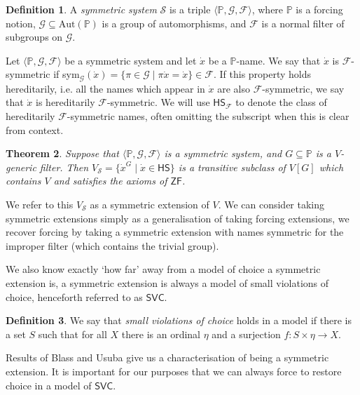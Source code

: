 \documentclass[a4paper,11pt]{amsart}
\newtheorem{theorem}{Theorem}[section]
\theoremstyle{definition}
\newtheorem{definition}[theorem]{Definition}
\newcommand{\p}{\mathbb{P}}
\newcommand{\ZF}{\mathsf{ZF}}
\newcommand{\HS}{\mathsf{HS}}
\newcommand{\SVC}{\mathsf{SVC}}
\begin{document}
\begin{definition}
    A \emph{symmetric system} $\mathscr{S}$ is a triple $\langle \p, \mathscr{G}, \mathscr{F} \rangle$, where $\p$ is a forcing notion, $\mathscr{G} \subseteq \text{Aut}(\p)$ is a group of automorphisms, and $\mathscr{F}$ is a normal filter of subgroups on $\mathscr{G}$.
\end{definition}

Let $\langle \p, \mathscr{G}, \mathscr{F} \rangle$ be a symmetric system and let $\dot{x}$ be a $\p$-name. We say that $\dot{x}$ is $\mathscr{F}$-symmetric if sym$_\mathscr{G}(\dot{x}) = \{ \pi \in \mathscr{G} \mid \pi \dot{x} = \dot{x}\} \in \mathscr{F}$. If this property holds hereditarily, i.e. all the names which appear in $\dot{x}$ are also $\mathscr{F}$-symmetric, we say that $\dot{x}$ is hereditarily $\mathscr{F}$-symmetric. We will use $\HS_\mathscr{F}$ to denote the class of hereditarily $\mathscr{F}$-symmetric names, often omitting the subscript when this is clear from context. 

\begin{theorem}
    Suppose that $\langle \p, \mathscr{G}, \mathscr{F} \rangle$ is a symmetric system, and $G \subseteq \p$ is a $V$-generic filter. Then $V_\mathscr{S} = \{ \dot{x}^G \mid \dot{x} \in \HS\}$ is a transitive subclass of $V[G]$ which contains $V$ and satisfies the axioms of $\ZF$. 
\end{theorem}

We refer to this $V_\mathscr{S}$ as a symmetric extension of $V$. We can consider taking symmetric extensions simply as a generalisation of taking forcing extensions, we recover forcing by taking a symmetric extension with names symmetric for the improper filter (which contains the trivial group).

We also know exactly `how far' away from a model of choice a symmetric extension is, a symmetric extension is always a model of small violations of choice, henceforth referred to as $\SVC$. 

\begin{definition}
    We say that \emph{small violations of choice} holds in a model if there is a set $S$ such that for all $X$ there is an ordinal $\eta$ and a surjection $f: S \times \eta \rightarrow X$.
\end{definition}


Results of Blass \cite{Blass-injectivity} and Usuba \cite{usuba} give us a characterisation of being a symmetric extension. It is important for our purposes that we can always force to restore choice in a model of $\SVC$. 
\end{document}
